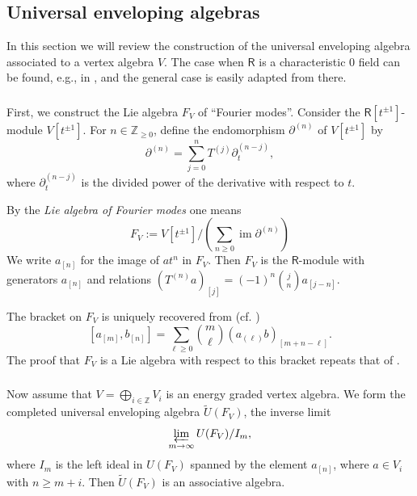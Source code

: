 \documentclass{amsart}
\theoremstyle{definition}
\newcommand{\sss}{\subsubsection{}}
\newcommand{\Ring}{\mathsf{R}}
\newcommand{\Z}{\mathbb{Z}}
\numberwithin{equation}{section}
\begin{document}
\subsection{Universal enveloping algebras}\label{SS_universal_enveloping}
In this section we will review the construction of the universal enveloping algebra associated to a vertex algebra $V$. The case when $\Ring$ is a characteristic $0$ field can be found, e.g., in \cite[Section 3.2]{Frenkel_loop}, and the general case is easily adapted from there. 

\sss
First, we construct the Lie algebra  $F_V$ of ``Fourier modes''. Consider the $\Ring[t^{\pm 1}]$-module $V[t^{\pm 1}]$. For $n\in \Z_{\geqslant 0}$, define the endomorphism $\partial^{(n)}$ of $V[t^{\pm 1}]$ by
$$\partial^{(n)}=\sum_{j=0}^n T^{(j)}\partial_t^{(n-j)},$$
where $\partial_t^{(n-j)}$ is the divided power of the derivative with respect to $t$.

By the {\it Lie algebra of Fourier modes} one means 
$$F_V:=V[t^{\pm 1}]/\left(\sum_{n\geqslant 0}\operatorname{im}\partial^{(n)}\right)$$
We write $a_{[n]}$ for the image of $at^n$ in $F_V$. Then $F_V$ is the $\Ring$-module with generators $a_{[n]}$ and relations 
$(T^{(n)}a)_{[j]}=(-1)^n{j\choose n}a_{[j-n]}$.

The bracket on $F_V$ is uniquely recovered from (cf. \cite[(3.2-2)]{Frenkel_loop}) 
$$[a_{[m]},b_{[n]}]=\sum_{\ell\geqslant 0}{m\choose \ell}(a_{(\ell)} b)_{[m+n-\ell]}.$$
The proof that $F_V$ is a Lie algebra with respect to this bracket repeats that of 
\cite[Proposition 3.2.1]{Frenkel_loop}.


\sss\label{SSS:Utilde}
Now assume that $V=\bigoplus_{i\in \Z}V_i$ is an energy graded vertex algebra. We form the completed universal enveloping algebra $\widetilde{U}(F_V)$, the inverse limit 
\begin{equation}\label{eq:inverse_limit}
\varprojlim_{m\rightarrow \infty} U(F_V)/I_m,
\end{equation}
where $I_m$ is the left ideal in $U(F_V)$ spanned by the element $a_{[n]}$, where $a\in V_i$ with $n\geqslant m+i$. Then $\widetilde{U}(F_V)$  is an associative algebra. 
\end{document}
